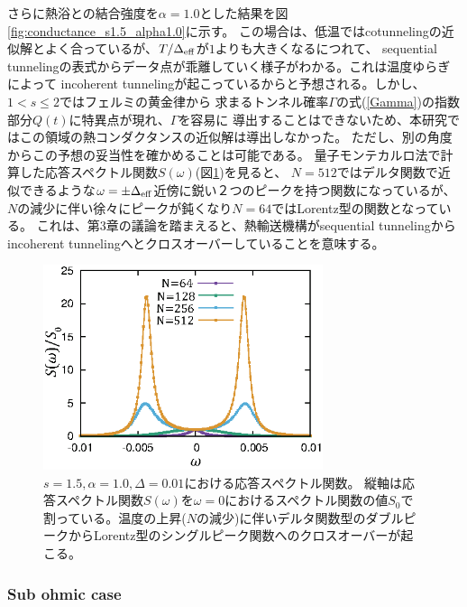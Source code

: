 さらに熱浴との結合強度を$\alpha=1.0$とした結果を図\ref{fig:conductance_s1.5_alpha1.0}に示す。
この場合は、低温ではcotunnelingの近似解とよく合っているが、$T/\Delta_{\rm eff}$が$1$よりも大きくなるにつれて、
sequential tunnelingの表式からデータ点が乖離していく様子がわかる。これは温度ゆらぎによって
incoherent tunnelingが起こっているからと予想される。しかし、$1<s\leq2$ではフェルミの黄金律から
求まるトンネル確率$\Gamma$の式(\ref{Gamma})の指数部分$Q(t)$に特異点が現れ\cite{Weiss12}、$\Gamma$を容易に
導出することはできないため、本研究ではこの領域の熱コンダクタンスの近似解は導出しなかった。
ただし、別の角度からこの予想の妥当性を確かめることは可能である。
量子モンテカルロ法で計算した応答スペクトル関数$S(\omega)$(図\ref{fig:spect_delta0.01_alpha1.0})を見ると、
$N=512$ではデルタ関数で近似できるような$\omega=\pm \Delta_{\rm eff}$近傍に鋭い２つのピークを持つ関数になっているが、
$N$の減少に伴い徐々にピークが鈍くなり$N=64$ではLorentz型の関数となっている。
これは、第3章の議論を踏まえると、熱輸送機構がsequential tunnelingからincoherent tunnelingへとクロスオーバーしていることを意味する。

\begin{figure}[tb]
	\centering
	\includegraphics[height=6cm]{spect_delta0.01_alpha1.0.eps}
	\caption{
	$s=1.5,\alpha=1.0,\Delta=0.01$における応答スペクトル関数。
	縦軸は応答スペクトル関数$S(\omega)$を$\omega=0$におけるスペクトル関数の値$S_0$で割っている。温度の上昇($N$の減少)に伴いデルタ関数型のダブルピークからLorentz型のシングルピーク関数へのクロスオーバーが起こる。
	}
	\label{fig:spect_delta0.01_alpha1.0}
\end{figure}

\subsubsection{Sub ohmic case}

